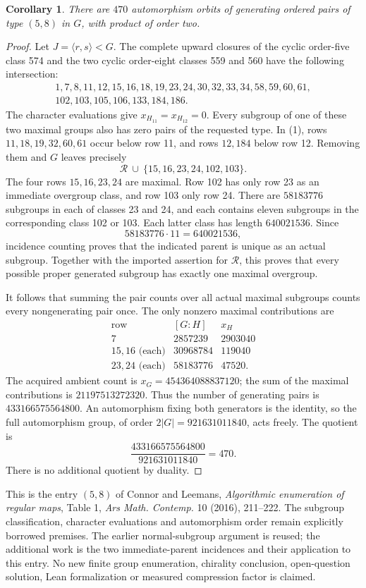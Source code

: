 \documentclass[11pt,a4paper]{article}
\newtheorem{corollary}{Corollary}
\begin{document}
\begin{corollary}
There are \(470\) automorphism orbits of generating ordered pairs of
type \((5,8)\) in \(G\), with product of order two.
\end{corollary}
\begin{proof}
Let \(J=\langle r,s\rangle<G\). The complete upward closures of the
cyclic order-five class 574 and the two cyclic order-eight classes
559 and 560 have the following intersection:
\[
\begin{split}
1,7,8,11,12,15,16,18,19,23,24,30,32,33,34,58,59,60,61,\\
102,103,105,106,133,184,186.
\end{split}                                                    \tag{1}
\]
The character evaluations give \(x_{H_{11}}=x_{H_{12}}=0\).
Every subgroup of one of these two maximal groups also has zero
pairs of the requested type. In (1), rows \(11,18,19,32,60,61\)
occur below row 11, and rows \(12,184\) below row 12.
Removing them and \(G\) leaves precisely
\[
                 \mathcal R\ \cup\ \{15,16,23,24,102,103\}.
\]
The four rows \(15,16,23,24\) are maximal. Row 102 has only
row 23 as an immediate overgroup class, and row 103 only row 24.
There are \(58183776\) subgroups in each of classes 23 and 24,
and each contains eleven subgroups in the corresponding class
102 or 103. Each latter class has length \(640021536\). Since
\[
                   58183776\cdot11=640021536,
\]
incidence counting proves that the indicated parent is unique as
an actual subgroup. Together with the imported assertion for
\(\mathcal R\), this proves that every possible proper generated
subgroup has exactly one maximal overgroup.

It follows that summing the pair counts over all actual maximal
subgroups counts every nongenerating pair once. The only nonzero
maximal contributions are
\[
\begin{array}{c|r|r}
\text{row}&[G:H]&x_H\\\hline
7&2857239&2903040\\
15,16\text{ (each)}&30968784&119040\\
23,24\text{ (each)}&58183776&47520.
\end{array}
\]
The acquired ambient count is \(x_G=454364088837120\); the sum of
the maximal contributions is \(21197513272320\). Thus the number
of generating pairs is \(433166575564800\). An automorphism fixing
both generators is the identity, so the full automorphism group,
of order \(2|G|=921631011840\), acts freely. The quotient is
\[
                \frac{433166575564800}{921631011840}=470.
\]
There is no additional quotient by duality.
\end{proof}

This is the entry \((5,8)\) of Connor and Leemans,
\emph{Algorithmic enumeration of regular maps}, Table 1,
\emph{Ars Math. Contemp.} 10 (2016), 211--222.
The subgroup classification, character evaluations and automorphism
order remain explicitly borrowed premises. The earlier normal-subgroup
argument is reused; the additional work is the two immediate-parent
incidences and their application to this entry. No new finite group
enumeration, chirality conclusion, open-question solution, Lean
formalization or measured compression factor is claimed.
\end{document}
